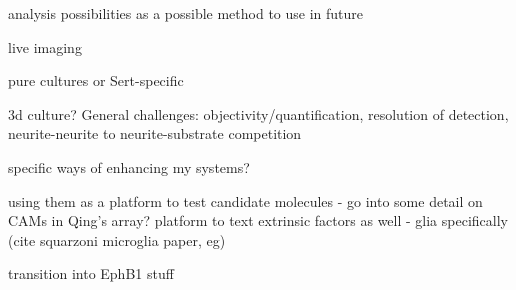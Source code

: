 

%
analysis possibilities
\cite{hopkins2014semi} as a possible method to use in future

live imaging

pure cultures or Sert-specific

3d culture?
General challenges: objectivity/quantification, resolution of detection, neurite-neurite to neurite-substrate competition

specific ways of enhancing my systems?

using them as a platform to test candidate molecules - go into some detail on CAMs in Qing's array?
platform to text extrinsic factors as well - glia specifically (cite squarzoni microglia paper, eg)

transition into EphB1 stuff